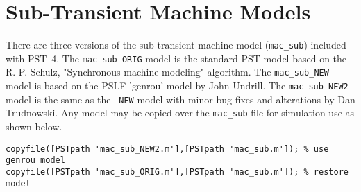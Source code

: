 \section{Sub-Transient Machine Models}  
There are three versions of the sub-transient machine model (\verb|mac_sub|) included with \mbox{PST 4}.
The \verb|mac_sub_ORIG| model is the standard PST model based on the R. P. Schulz, "Synchronous machine modeling" algorithm.
The \verb|mac_sub_NEW| model is based on the PSLF 'genrou' model by John Undrill.
The \verb|mac_sub_NEW2| model is the same as the \verb|_NEW| model with minor bug fixes and alterations by Dan Trudnowski.
Any model may be copied over the \verb|mac_sub| file for simulation use as shown below.
\begin{verbatim}
copyfile([PSTpath 'mac_sub_NEW2.m'],[PSTpath 'mac_sub.m']); % use genrou model
copyfile([PSTpath 'mac_sub_ORIG.m'],[PSTpath 'mac_sub.m']); % restore model
\end{verbatim} 
